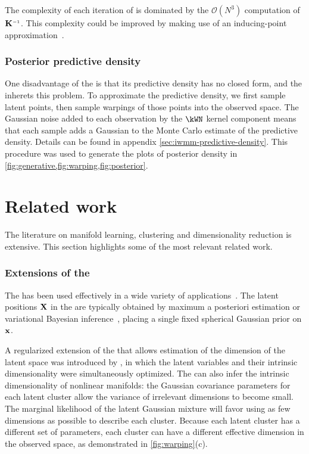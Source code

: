 The complexity of each iteration of \HMC{} is dominated by the $\mathcal{O}(N^3)$ computation of $\vK\inv$.
This complexity could be improved by making use of an inducing-point approximation~\citep{quinonero2005unifying,snelson2006sparse}.



\subsubsection{Posterior predictive density}

One disadvantage of the \gplvm{} is that its predictive density has no closed form, and the \iwmm{} inherets this problem.
To approximate the predictive density, we first sample latent points, then sample warpings of those points into the observed space. %
The Gaussian noise added to each observation by the $\kWN$ kernel component means that each sample adds a Gaussian to the Monte Carlo estimate of the predictive density.
Details can be found in appendix \ref{sec:iwmm-predictive-density}.
This procedure was used to generate the plots of posterior density in \cref{fig:generative,fig:warping,fig:posterior}.





\section{Related work}
\label{sec:iwmm-related-work}

The literature on manifold learning, clustering and dimensionality reduction is extensive.
This section highlights some of the most relevant related work.

\subsubsection{Extensions of the \sgplvm{}}

The \gplvm{} has been used effectively in a wide variety of applications~\citep{lawrence2004gaussian,salzmann2008local,lawrence2009non}.
The latent positions $\mathbf{X}$ in the \gplvm{} are typically obtained by maximum a posteriori estimation or variational Bayesian inference~\citep{titsias2010bayesian}, placing a single fixed spherical Gaussian prior on ${\bf{x}}$.

A regularized extension of the \gplvm{} that allows estimation of the dimension of the latent space was introduced by \citet{geiger2009rank}, in which the latent variables and their intrinsic dimensionality were simultaneously optimized.
The \iwmm{} can also infer the intrinsic dimensionality of nonlinear manifolds:
the Gaussian covariance parameters for each latent cluster allow the variance of irrelevant dimensions to become small.
The marginal likelihood of the latent Gaussian mixture will favor using as few dimensions as possible to describe each cluster.
Because each latent cluster has a different set of parameters, each cluster can have a different effective dimension in the observed space,
as demonstrated in \cref{fig:warping}(c).

